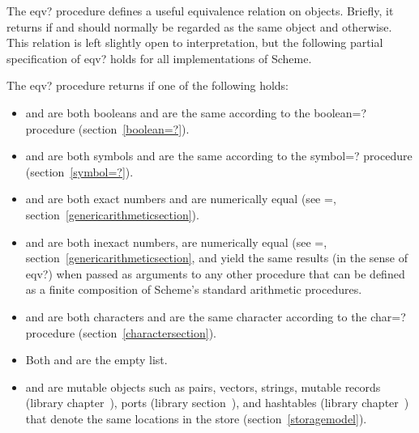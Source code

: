\begin{entry}{%
}

The {\cf eqv?} procedure defines a useful equivalence relation on objects.
Briefly, it returns \schtrue{} if  and  should
normally be regarded as the same object and \schfalse{} otherwise.  This relation is left slightly
open to interpretation, but the following partial specification of
{\cf eqv?} holds for all implementations of Scheme.

The {\cf eqv?} procedure returns \schtrue{} if one of the following holds:

\begin{itemize}
\item {} and  are both booleans and are the same
  according to the {\cf boolean=?} procedure (section~\ref{boolean=?}).

\item {} and  are both symbols and are the same
  according to the {\cf symbol=?} procedure (section~\ref{symbol=?}).

\item {} and  are both exact numbers
  and are numerically equal (see {\cf =}, 
  section~\ref{genericarithmeticsection}).

\item {} and  are both inexact numbers, are numerically
  equal (see {\cf =}, section~\ref{genericarithmeticsection}, and
  yield the same results (in the sense of {\cf eqv?}) when passed
  as arguments to any other procedure that can be defined
  as a finite composition of Scheme's standard arithmetic
  procedures.

\item {} and  are both characters and are the same
character according to the {\cf char=?} procedure
(section~\ref{charactersection}).

\item Both  and  are the empty list.

\item {} and  are mutable objects such as pairs,
  vectors, strings, mutable records (library
  chapter~), ports (library
  section~), and hashtables (library
  chapter~) that denote the
  same locations in the store (section~\ref{storagemodel}).


\end{itemize}
\end{entry}

